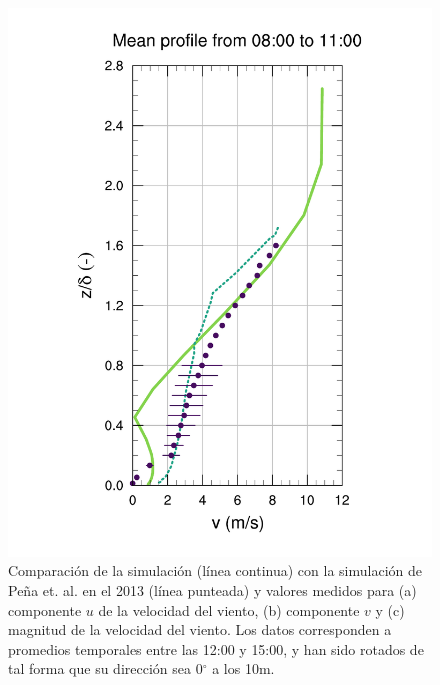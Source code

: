 \begin{figure}[H]
\begin{center}
		\includegraphics[height=0.62\linewidth,page=37,trim={48mm 10mm 41mm 25mm},clip]{Imagenes/06/hov/9V}%
	\end{center}
	\caption{Comparación de la simulación (línea continua) con la simulación de Peña et. al. en el 2013 (línea punteada) y valores medidos para (a) componente $u$ de la velocidad del viento, (b) componente $v$ y (c) magnitud de la velocidad del viento. Los datos corresponden a promedios temporales entre las 12:00 y 15:00, y han sido rotados de tal forma que su dirección sea 0$^\circ$ a los 10m.}
	\label{fig:06_hov_pena}
\end{figure}

